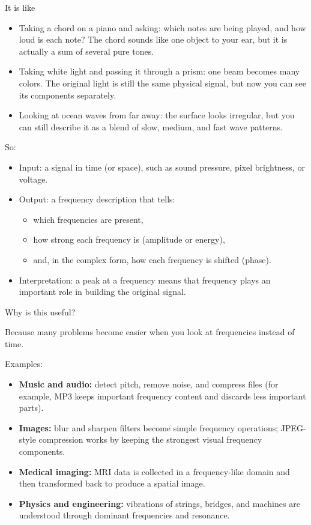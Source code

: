 It is like
\begin{itemize}
\item Taking a chord on a piano and asking: which notes are being played, and how loud is each note?
The chord sounds like one object to your ear, but it is actually a sum of several pure tones.
\item Taking white light and passing it through a prism: one beam becomes many colors.
The original light is still the same physical signal, but now you can see its components separately.
\item Looking at ocean waves from far away: the surface looks irregular, but you can still describe it as a blend of slow, medium, and fast wave patterns.
\end{itemize}

So:
\begin{itemize}
\item Input: a signal in time (or space), such as sound pressure, pixel brightness, or voltage.
\item Output: a frequency description that tells:
  \begin{itemize}
  \item which frequencies are present,
  \item how strong each frequency is (amplitude or energy),
  \item and, in the complex form, how each frequency is shifted (phase).
  \end{itemize}
\item Interpretation: a peak at a frequency means that frequency plays an important role in building the original signal.
\end{itemize}

Why is this useful?

Because many problems become easier when you look at frequencies instead of time.

Examples:
\begin{itemize}
\item \textbf{Music and audio:} detect pitch, remove noise, and compress files (for example, MP3 keeps important frequency content and discards less important parts).
\item \textbf{Images:} blur and sharpen filters become simple frequency operations; JPEG-style compression works by keeping the strongest visual frequency components.
\item \textbf{Medical imaging:} MRI data is collected in a frequency-like domain and then transformed back to produce a spatial image.
\item \textbf{Physics and engineering:} vibrations of strings, bridges, and machines are understood through dominant frequencies and resonance.
\end{itemize}

